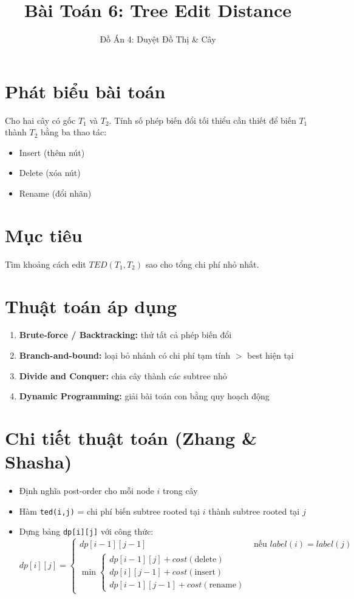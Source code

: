 \documentclass[12pt]{article}
\title{Bài Toán 6: Tree Edit Distance}
\author{Đồ Án 4: Duyệt Đồ Thị \& Cây}
\date{}
\begin{document}
\maketitle

\section*{Phát biểu bài toán}
Cho hai cây có gốc $T_1$ và $T_2$. Tính số phép biến đổi tối thiểu cần thiết để biến $T_1$ thành $T_2$ bằng ba thao tác:
\begin{itemize}
    \item Insert (thêm nút)
    \item Delete (xóa nút)
    \item Rename (đổi nhãn)
\end{itemize}

\section*{Mục tiêu}
Tìm khoảng cách edit $TED(T_1, T_2)$ sao cho tổng chi phí nhỏ nhất.

\section*{Thuật toán áp dụng}
\begin{enumerate}[label=(\alph*)]
    \item \textbf{Brute-force / Backtracking:} thử tất cả phép biến đổi
    \item \textbf{Branch-and-bound:} loại bỏ nhánh có chi phí tạm tính $>$ best hiện tại
    \item \textbf{Divide and Conquer:} chia cây thành các subtree nhỏ
    \item \textbf{Dynamic Programming:} giải bài toán con bằng quy hoạch động
\end{enumerate}

\section*{Chi tiết thuật toán (Zhang & Shasha)}
\begin{itemize}
    \item Định nghĩa post-order cho mỗi node $i$ trong cây
    \item Hàm \texttt{ted(i,j)} = chi phí biến subtree rooted tại $i$ thành subtree rooted tại $j$
    \item Dựng bảng \texttt{dp[i][j]} với công thức:
    \[
    dp[i][j] =
    \begin{cases}
    dp[i-1][j-1] & \text{nếu } label(i)=label(j)\\
    \min\begin{cases}
        dp[i-1][j] + cost(\text{delete}) \\
        dp[i][j-1] + cost(\text{insert}) \\
        dp[i-1][j-1] + cost(\text{rename})
    \end{cases}
    \end{cases}
    \]
\end{itemize}
\end{document}
